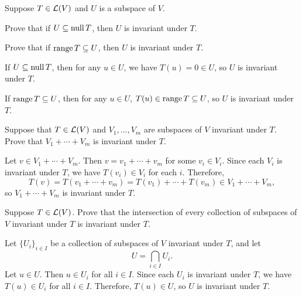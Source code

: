 \begin{exc}

\begin{exercise}
Suppose $T\in\mathcal{L}(V)$ and $U$ is a subspace of $V$.
\begin{parts}
\item Prove that if $U\subseteq\operatorname{null} T$, then $U$ is invariant under $T$.
\item Prove that if $\operatorname{range} T\subseteq U$, then $U$ is invariant under $T$.
\end{parts}
\end{exercise}
\begin{solution}
\begin{parts}
\item If $U\subseteq\operatorname{null} T$, then for any $u\in U$, we have $T(u)=0\in U$, so
  $U$ is invariant under $T$.
\item If $\operatorname{range} T\subseteq U$, then for any $u\in U$,
  $T(u)\in\operatorname{range} T\subseteq U$, so $U$ is invariant under $T$. \qedhere
\end{parts}
\end{solution}

\begin{exercise}
Suppose that $T\in\mathcal{L}(V)$ and $V_1,\dots,V_m$ are subspaces of $V$ invariant
under $T$. Prove that $V_1+\cdots+V_m$ is invariant under $T$.
\end{exercise}
\begin{solution}
Let $v\in V_1+\cdots+V_m$. Then $v=v_1+\cdots+v_m$ for some $v_i\in V_i$. Since
each $V_i$ is invariant under $T$, we have $T(v_i)\in V_i$ for each $i$.
Therefore,
\[ T(v) = T(v_1+\cdots+v_m) = T(v_1)+\cdots+T(v_m) \in V_1+\cdots+V_m, \]
so $V_1+\cdots+V_m$ is invariant under $T$.
\end{solution}

\begin{exercise}
Suppose $T\in\mathcal{L}(V)$. Prove that the intersection of every collection of
subspaces of $V$ invariant under $T$ is invariant under $T$.
\end{exercise}
\begin{solution}
Let $\{U_i\}_{i\in I}$ be a collection of subspaces of $V$ invariant under $T$,
and let
\[ U = \bigcap_{i\in I} U_i. \]
Let $u\in U$. Then $u\in U_i$ for all $i\in I$. Since each $U_i$ is invariant
under $T$, we have $T(u)\in U_i$ for all $i\in I$. Therefore, $T(u)\in U$, so
$U$ is invariant under $T$.
\end{solution}


\end{exc}

